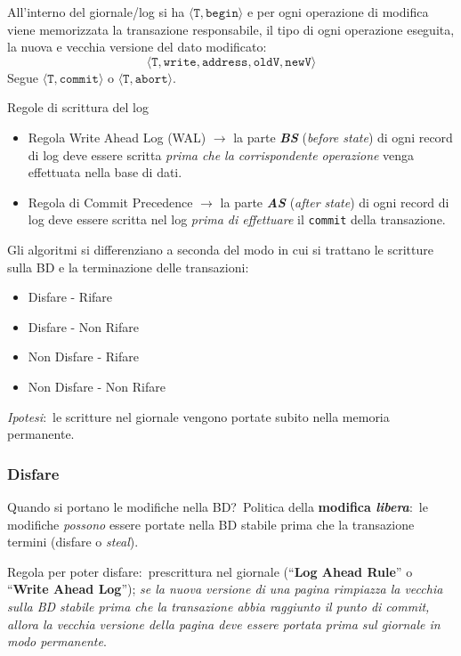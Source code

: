 \noindent All'interno del giornale/log si ha $\langle\mathtt{T, begin}\rangle$ e per ogni operazione di modifica viene memorizzata la transazione responsabile, il tipo di ogni operazione eseguita, la nuova e vecchia versione del dato modificato:\ \[\langle\mathtt{T,write, address, oldV, newV}\rangle\]
Segue $\langle\mathtt{T, commit}\rangle$ o $\langle\mathtt{T, abort}\rangle$.
\vspace{12pt}

\noindent Regole di scrittura del log
\begin{itemize}
	\item Regola Write Ahead Log (WAL) $\rightarrow$ la parte \textbf{\textit{BS}} (\textit{before state}) di ogni record di log deve essere scritta \textit{prima che la corrispondente operazione} venga effettuata nella base di dati.
	\item Regola di Commit Precedence $\rightarrow$ la parte \textbf{\textit{AS}} (\textit{after state}) di ogni record di log deve essere scritta nel log \textit{prima di effettuare} il \texttt{commit} della transazione.
\end{itemize}

\noindent Gli algoritmi si differenziano a seconda del modo in cui si trattano le scritture sulla BD e la terminazione delle transazioni:

\begin{itemize}
	\item Disfare - Rifare
	\item Disfare - Non Rifare
	\item Non Disfare - Rifare
	\item Non Disfare - Non Rifare
\end{itemize}

\noindent \textit{Ipotesi}:\ le scritture nel giornale vengono portate subito nella memoria permanente.

\subsubsection{Disfare}

Quando si portano le modifiche nella BD?\
Politica della \textbf{modifica \textit{libera}}:\ le modifiche \textit{possono} essere portate nella BD stabile prima che la transazione termini (disfare o \textit{steal}).\

Regola per poter disfare:\ prescrittura nel giornale (``\textbf{Log Ahead Rule}'' o ``\textbf{Write Ahead Log}''); \textit{se la nuova versione di una pagina rimpiazza la vecchia sulla BD stabile prima che la transazione abbia raggiunto il punto di commit, allora la vecchia versione della pagina deve essere portata prima sul giornale in modo permanente}.

